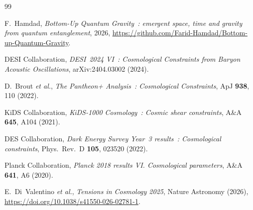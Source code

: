 \documentclass[a4paper,11pt]{article}
\begin{document}

\begin{thebibliography}{99}

F.~Hamdad,
\textit{Bottom-Up Quantum Gravity~: emergent space, time and gravity from
quantum entanglement}, 2026,
\url{https://github.com/Farid-Hamdad/Bottom-up-Quantum-Gravity}.

DESI Collaboration,
\textit{DESI~2024 VI~: Cosmological Constraints from Baryon Acoustic Oscillations},
arXiv:2404.03002 (2024).

D.~Brout \textit{et al.},
\textit{The Pantheon+ Analysis~: Cosmological Constraints},
ApJ \textbf{938}, 110 (2022).

KiDS Collaboration,
\textit{KiDS-1000 Cosmology~: Cosmic shear constraints},
A\&A \textbf{645}, A104 (2021).

DES Collaboration,
\textit{Dark Energy Survey Year~3 results~: Cosmological constraints},
Phys.\ Rev.\ D \textbf{105}, 023520 (2022).

Planck Collaboration,
\textit{Planck 2018 results VI. Cosmological parameters},
A\&A \textbf{641}, A6 (2020).

E.~Di~Valentino \textit{et al.},
\textit{Tensions in Cosmology 2025},
Nature Astronomy (2026), \url{https://doi.org/10.1038/s41550-026-02781-1}.

\end{thebibliography}
\end{document}
